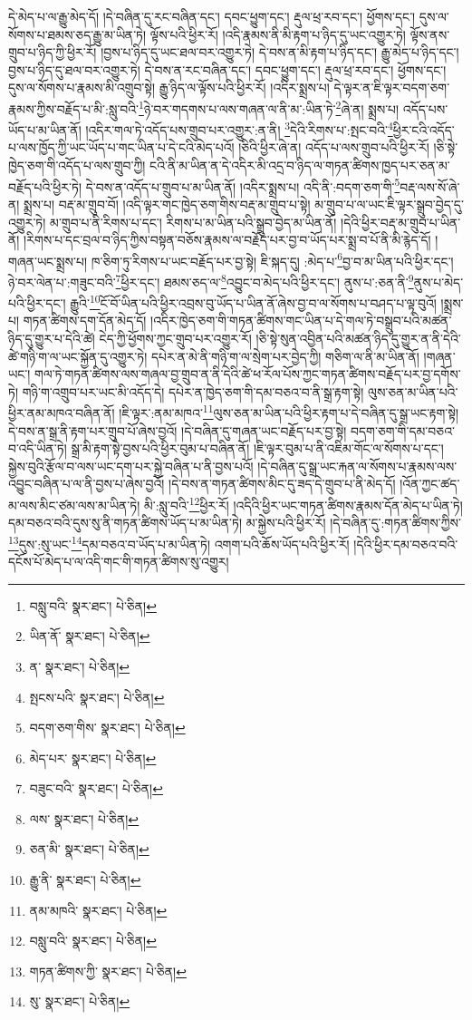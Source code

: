 དེ་མེད་པ་ལ་རྒྱུ་མེད་དོ། །དེ་བཞིན་དུ་རང་བཞིན་དང་། དབང་ཕྱུག་དང་། རྡུལ་ཕྲ་རབ་དང་། ཕྱོགས་དང་། དུས་ལ་སོགས་པ་ཐམས་ཅད་རྒྱུ་མ་ཡིན་ཏེ། ལྟོས་པའི་ཕྱིར་རོ། །འདི་རྣམས་ནི་མི་རྟག་པ་ཉིད་དུ་ཡང་འགྱུར་ཏེ། ལྟོས་ནས་གྲུབ་པ་ཉིད་ཀྱི་ཕྱིར་རོ། །བྱས་པ་ཉིད་དུ་ཡང་ཐལ་བར་འགྱུར་ཏེ། དེ་བས་ན་མི་རྟག་པ་ཉིད་དང་། རྒྱུ་མེད་པ་ཉིད་དང་། བྱས་པ་ཉིད་དུ་ཐལ་བར་འགྱུར་ཏེ། དེ་བས་ན་རང་བཞིན་དང་། དབང་ཕྱུག་དང་། རྡུལ་ཕྲ་རབ་དང་། ཕྱོགས་དང་། དུས་ལ་སོགས་པ་རྣམས་མི་འགྲུབ་སྟེ། རྒྱུ་ཉིད་ལ་ལྟོས་པའི་ཕྱིར་རོ། །འདིར་སྨྲས་པ། དེ་ལྟར་ན་ཇི་ལྟར་བདག་ཅག་རྣམས་ཀྱིས་བརྗོད་པ་མི་:སླུ་བའི་\footnote{བསླུ་བའི་  སྣར་ཐང་།  པེ་ཅིན། }ཉེ་བར་གདགས་པ་ལས་གཞན་ལ་ནི་མ་:ཡིན་ཏེ་\footnote{ཡིན་ནོ་  སྣར་ཐང་།  པེ་ཅིན། }ཞེ་ན། སྨྲས་པ། འདོད་པས་ཡོད་པ་མ་ཡིན་ནོ། །འདིར་གལ་ཏེ་འདོད་པས་གྲུབ་པར་འགྱུར་:ན་ནི། \footnote{ན་  སྣར་ཐང་།  པེ་ཅིན། }དེའི་རིགས་པ་:སྤང་བའི་\footnote{སྤངས་པའི་  སྣར་ཐང་།  པེ་ཅིན། }ཕྱིར་ངའི་འདོད་པ་ལས་ཁྱོད་ཀྱི་ཡང་ཡོད་པ་གང་ཡིན་པ་དེ་ངའི་མེད་པའོ། །ཅིའི་ཕྱིར་ཞེ་ན། འདོད་པ་ལས་གྲུབ་པའི་ཕྱིར་རོ། །ཅི་སྟེ་ཁྱེད་ཅག་གི་འདོད་པ་ལས་གྲུབ་ཀྱི། ངའི་ནི་མ་ཡིན་ན་དེ་འདིར་མི་འདྲ་བ་ཉིད་ལ་གཏན་ཚིགས་ཁྱད་པར་ཅན་མ་བརྗོད་པའི་ཕྱིར་ཏེ། དེ་བས་ན་འདོད་པ་གྲུབ་པ་མ་ཡིན་ནོ། །འདིར་སྨྲས་པ། འདི་ནི་:བདག་ཅག་གི་\footnote{བདག་ཅག་གིས་  སྣར་ཐང་།  པེ་ཅིན། }བརྡ་ལས་སོ་ཞེ་ན། སྨྲས་པ། བརྡ་མ་གྲུབ་བོ། །འདི་ལྟར་གང་ཁྱེད་ཅག་གིས་བརྡ་མ་གྲུབ་པ་སྟེ། མ་གྲུབ་པ་ལ་ཡང་ཇི་ལྟར་སྒྲུབ་བྱེད་དུ་འགྱུར་ཏེ། མ་གྲུབ་པ་ནི་རིགས་པ་དང་། རིགས་པ་མ་ཡིན་པའི་སྒྲུབ་བྱེད་མ་ཡིན་ནོ། །དེའི་ཕྱིར་བརྡ་མ་གྲུབ་པ་ཡིན་ནོ། །རིགས་པ་དང་བྲལ་བ་ཉིད་ཀྱིས་བསྟན་བཅོས་རྣམས་ལ་བརྗོད་པར་བྱ་བ་ཡོད་པར་སྨྲ་བ་པོ་ནི་མི་རྙེད་དོ། །གཞན་ཡང་སྨྲས་པ། ཁ་ཅིག་ཏུ་རིགས་པ་ཡང་བརྗོད་པར་བྱ་སྟེ། ཇི་སྐད་དུ། :མེད་པ་\footnote{མེད་པར་  སྣར་ཐང་།  པེ་ཅིན། }བྱ་བ་མ་ཡིན་པའི་ཕྱིར་དང་། ཉེ་བར་ལེན་པ་:གཟུང་བའི་\footnote{བཟུང་བའི་  སྣར་ཐང་།  པེ་ཅིན། }ཕྱིར་དང་། ཐམས་ཅད་ལ་\footnote{ལས་  སྣར་ཐང་།  པེ་ཅིན། }འབྱུང་བ་མེད་པའི་ཕྱིར་དང་། ནུས་པ་:ཅན་ནི་\footnote{ཅན་མི་  སྣར་ཐང་།  པེ་ཅིན། }ནུས་པ་མེད་པའི་ཕྱིར་དང་། རྒྱུའི་\footnote{རྒྱུ་ནི་  སྣར་ཐང་།  པེ་ཅིན། }ངོ་བོ་ཡིན་པའི་ཕྱིར་འབྲས་བུ་ཡོད་པ་ཡིན་ནོ་ཞེས་བྱ་བ་ལ་སོགས་པ་བཤད་པ་ལྟ་བུའོ། །སྨྲས་པ། གཏན་ཚིགས་དག་དོན་མེད་དོ། །འདིར་ཁྱེད་ཅག་གི་གཏན་ཚིགས་གང་ཡིན་པ་དེ་གལ་ཏེ་བསྒྲུབ་པའི་མཚན་ཉིད་དུ་གྱུར་པ་དེའི་ཚེ། ངེད་ཀྱི་ཕྱོགས་ཀྱང་གྲུབ་པར་འགྱུར་རོ། །ཅི་སྟེ་སུན་འབྱིན་པའི་མཚན་ཉིད་དུ་གྱུར་ན་ནི་དེའི་ཚེ་གཉི་ག་ལ་ཡང་སྐྱོན་དུ་འགྱུར་ཏེ། དཔེར་ན་མེ་ནི་གཉི་ག་ལ་སྲེག་པར་བྱེད་ཀྱི། གཅིག་ལ་ནི་མ་ཡིན་ནོ། །གཞན་ཡང་། གལ་ཏེ་གཏན་ཚིགས་ལས་གཞལ་བྱ་གྲུབ་ན་ནི་དེའི་ཚེ་ཕ་རོལ་པོས་ཀྱང་གཏན་ཚིགས་བརྗོད་པར་བྱ་དགོས་ཏེ། གཉི་ག་འགྲུབ་པར་ཡང་མི་འདོད་དེ། དཔེར་ན་ཁྱེད་ཅག་གི་དམ་བཅའ་བ་ནི་སྒྲ་རྟག་སྟེ། ལུས་ཅན་མ་ཡིན་པའི་ཕྱིར་ནམ་མཁའ་བཞིན་ནོ། །ཇི་ལྟར་:ནམ་མཁའ་\footnote{ནམ་མཁའི་  སྣར་ཐང་།  པེ་ཅིན། }ལུས་ཅན་མ་ཡིན་པའི་ཕྱིར་རྟག་པ་དེ་བཞིན་དུ་སྒྲ་ཡང་རྟག་སྟེ། དེ་བས་ན་སྒྲ་ནི་རྟག་པར་གྲུབ་པོ་ཞེས་བྱའོ། །དེ་བཞིན་དུ་གཞན་ཡང་བརྗོད་པར་བྱ་སྟེ། བདག་ཅག་གི་དམ་བཅའ་བ་འདི་ཡིན་ཏེ། སྒྲ་མི་རྟག་སྟེ་བྱས་པའི་ཕྱིར་བུམ་པ་བཞིན་ནོ། །ཇི་ལྟར་བུམ་པ་ནི་འཇིམ་གོང་ལ་སོགས་པ་དང་། སྐྱེས་བུའི་རྩོལ་བ་ལས་ཡང་དག་པར་སྐྱེ་བཞིན་པ་ནི་བྱས་པའོ། །དེ་བཞིན་དུ་སྒྲ་ཡང་རྐན་ལ་སོགས་པ་རྣམས་ལས་འབྱུང་བཞིན་པ་ལ་ནི་བྱས་པ་ཞེས་བྱའོ། །དེ་བས་ན་གཏན་ཚིགས་མིང་དུ་ཟད་དེ་གྲུབ་པ་ནི་མེད་དོ། །འོན་ཀྱང་ཚད་མ་ལས་མིང་ཙམ་ལས་མ་ཡིན་ཏེ། མི་:སླུ་བའི་\footnote{བསླུ་བའི་  སྣར་ཐང་།  པེ་ཅིན། }ཕྱིར་རོ། །འདིའི་ཕྱིར་ཡང་གཏན་ཚིགས་རྣམས་དོན་མེད་པ་ཡིན་ཏེ། དམ་བཅའ་བའི་དུས་སུ་ནི་གཏན་ཚིགས་ཡོད་པ་མ་ཡིན་ཏེ། མ་སྐྱེས་པའི་ཕྱིར་རོ། །དེ་བཞིན་དུ་:གཏན་ཚིགས་ཀྱིས་\footnote{གཏན་ཚིགས་ཀྱི་  སྣར་ཐང་།  པེ་ཅིན། }དུས་:སུ་ཡང་\footnote{སུ་  སྣར་ཐང་།  པེ་ཅིན། }དམ་བཅའ་བ་ཡོད་པ་མ་ཡིན་ཏེ། འགག་པའི་ཆོས་ཡོད་པའི་ཕྱིར་རོ། །དེའི་ཕྱིར་དམ་བཅའ་བའི་དངོས་པོ་མེད་པ་ལ་འདི་གང་གི་གཏན་ཚིགས་སུ་འགྱུར། 